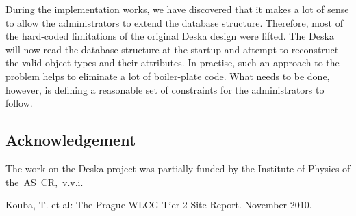 \documentclass[11pt]{article}
\begin{document}
During the implementation works, we have discovered that it makes a lot of sense
to allow the administrators to extend the database structure.  Therefore, most
of the hard-coded limitations of the original Deska design were lifted.  The
Deska will now read the database structure at the startup and attempt to
reconstruct the valid object types and their attributes.  In practise, such an
approach to the problem helps to eliminate a lot of boiler-plate code.  What
needs to be done, however, is defining a reasonable set of constraints for the
administrators to follow.


\subsection{Acknowledgement}

The work on the Deska project was partially funded by the Institute of Physics
of the~AS~CR,~v.v.i.

\begin{thebibliography}{9}
    Kouba, T. et al: The Prague WLCG Tier-2 Site Report. November
        2010.
\end{thebibliography}
\end{document}
